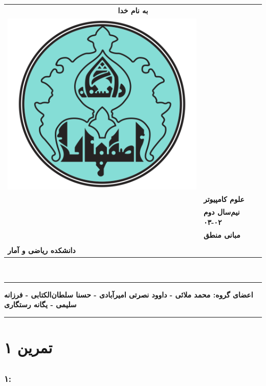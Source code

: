 \documentclass[]{exam}
\begin{document}
\pagestyle{head}
\firstpageheader{}{}{}
\runningheadrule
\begin{tabular}{p{} l}
\multicolumn{2}{c}{\textbf{به نام خدا}}\\
\multirow{2}{*}{\includegraphics[scale=0.2] {UILOGO.png}} & \\ \\
&  \textbf{علوم کامپیوتر}\\
&  \textbf{نیم‌سال دوم ۰۲-۰۳}\\
&  \textbf{مبانی منطق}\\ \\
 \textbf{دانشکده ریاضی و آمار} &  \\
\end{tabular}\\

\rule[1ex]{\textwidth}{.1pt}
\textbf{
    اعضای گروه: 
    محمد ملائی - داوود نصرتی امیرآبادی - 
    حسنا سلطان‌الکتابی - فرزانه سلیمی - یگانه رستگاری
}


\rule[1ex]{\textwidth}{.1pt}
\vspace{0pt}

\section*{تمرین ۱}


\subsection*{\color{blue}{جواب}}
\subsubsection*{۱:}

\end{document}
